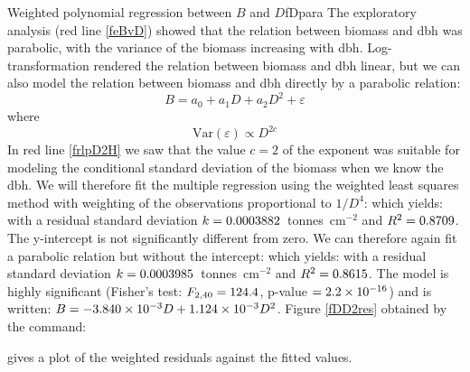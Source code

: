 \begin{filrouge}{Weighted polynomial regression between $B$ and $D$}{fDpara}%
The exploratory analysis (red line \ref{feBvD}) showed that the relation between biomass and dbh was parabolic, with the variance of the biomass increasing with dbh. Log-transformation rendered the relation between biomass and dbh linear, but we can also model the relation between biomass and dbh directly by a parabolic relation:
\[
B=a_0+a_1D+a_2D^2+\varepsilon
\]
where
\[
\mathrm{Var}(\varepsilon)\propto D^{2c}
\]
In red line \ref{frlpD2H} we saw that the value $c=2$ of the exponent was suitable for modeling the conditional standard deviation of the biomass when we know the dbh. We will therefore fit the multiple regression using the weighted least squares method with weighting of the observations proportional to $1/D^4$:
%
which yields:
%
with a residual standard deviation 
$k=\mbox{0.0003882}$~tonnes~cm$^{-2}$ and
$R^2=\mbox{0.8709}$. The y-intercept is not significantly different from zero. We can therefore again fit a parabolic relation but without the intercept:
%
which yields:
%
with a residual standard deviation 
$k=\mbox{0.0003985}$~tonnes~cm$^{-2}$ and
$R^2=\mbox{0.8615}$. The model is highly significant
(Fisher's test: $F_{2,40}=\mbox{124.4}$, p-value
$=\mbox{2.2}\times10^{-16}$) and is written: 
$B=-\mbox{3.840}\times10^{-3}D+\mbox{1.124}\times10^{-3}D^2$.
 Figure \ref{fDD2res} obtained by the command:

%
gives a plot of the weighted residuals against the fitted values.

\end{filrouge}


